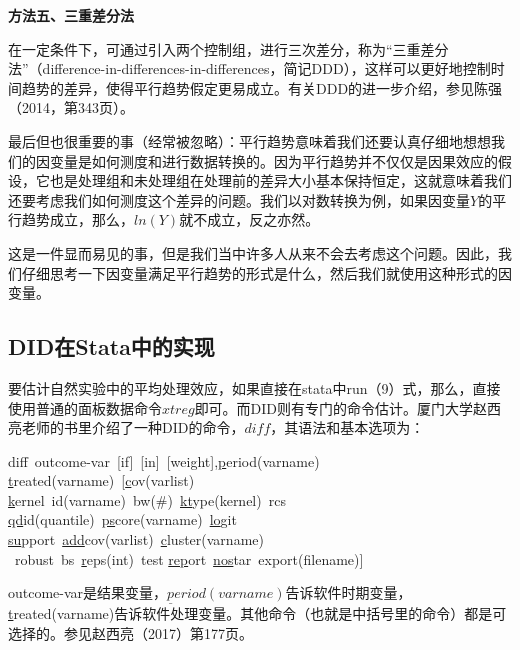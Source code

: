 \documentclass[cn,10pt,math=newtx,citestyle=gb7714-2015,bibstyle=gb7714-2015]{elegantbook}
\begin{document}
	\textbf{方法五、三重差分法}
	
	在一定条件下，可通过引入两个控制组，进行三次差分，称为“三重差分法”（difference-in-differences-in-differences，简记DDD），这样可以更好地控制时间趋势的差异，使得平行趋势假定更易成立。有关DDD的进一步介绍，参见陈强（2014，第343页）。
	
	最后但也很重要的事（经常被忽略）：平行趋势意味着我们还要认真仔细地想想我们的因变量是如何测度和进行数据转换的。因为平行趋势并不仅仅是因果效应的假设，它也是处理组和未处理组在处理前的差异大小基本保持恒定，这就意味着我们还要考虑我们如何测度这个差异的问题。我们以对数转换为例，如果因变量$Y$的平行趋势成立，那么，$ln(Y)$就不成立，反之亦然。
	
	这是一件显而易见的事，但是我们当中许多人从来不会去考虑这个问题。因此，我们仔细思考一下因变量满足平行趋势的形式是什么，然后我们就使用这种形式的因变量。
	
	\subsection{DID在Stata中的实现}
	
	要估计自然实验中的平均处理效应，如果直接在stata中run（9）式，那么，直接使用普通的面板数据命令$xtreg$即可。而DID则有专门的命令估计。厦门大学赵西亮老师的书里介绍了一种DID的命令，$diff$，其语法和基本选项为：
	\begin{flushleft}
		diff~outcome-var~[if]~[in]~[weight],\underline{p}eriod(varname)~\\
		\underline{t}reated(varname)~[\underline{c}ov(varlist)~\\
		\underline{k}ernel~id(varname)~bw(\#)~\underline{kt}ype(kernel)~rcs~\\
		\underline{qd}id(quantile)~\underline{ps}core(varname)~\underline{lo}git~\\
		\underline{su}pport~\underline{add}cov(varlist)~\underline{c}luster(varname)\\
		~robust~bs~\underline{r}eps(int)~test \underline{rep}ort~\underline{nos}tar~export(filename)]
	\end{flushleft}
	
	outcome-var是结果变量，$\underline{p}eriod(varname)$告诉软件时期变量，\underline{t}reated(varname)告诉软件处理变量。其他命令（也就是中括号里的命令）都是可选择的。参见赵西亮（2017）第177页。
	
\end{document}
